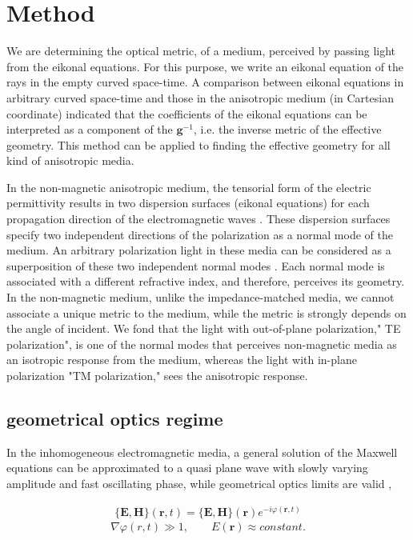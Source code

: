\documentclass[9pt,twocolumn,twoside]{osajnl}
\begin{document}
\section{ Method}

We are determining the optical metric, of a medium, perceived by passing light from the eikonal equations.
For this purpose, we write an eikonal equation of the rays in the empty curved space-time. A comparison between eikonal equations in arbitrary curved space-time and those in the anisotropic medium (in Cartesian coordinate) indicated that the coefficients of the eikonal equations can be interpreted as a component of the $\mathbf{g}^{-1}$, i.e. the inverse metric of the effective geometry. 
This method can be applied to finding the effective geometry for all kind of anisotropic media.

In the non-magnetic anisotropic medium, the tensorial form of the electric permittivity results in two dispersion surfaces (eikonal equations) for each propagation direction of the electromagnetic waves \cite{born1999principles}. 
These dispersion surfaces specify two independent directions of the polarization as a normal mode of the medium. An arbitrary polarization light in these media can be considered as a superposition of these two independent normal modes \cite{saleh1991fundamentals}.
 Each normal mode is associated with a different refractive index, and therefore, perceives its geometry.  In the non-magnetic medium, unlike the impedance-matched media, we cannot associate a unique metric to the medium, while the metric is strongly depends on the angle of incident.
We fond that the light with out-of-plane polarization," TE polarization",  is one of the normal modes that perceives non-magnetic media as an isotropic response from the medium, whereas the light with in-plane polarization "TM polarization," sees the anisotropic response. 



\subsection{geometrical optics regime}

In the inhomogeneous electromagnetic media, a general solution of the Maxwell equations can be approximated to a quasi plane wave with slowly varying amplitude and fast oscillating phase, while geometrical optics limits are valid \cite{kravtsov1990geometrical, sluijter2010ray, leonhardt2012geometry}, 

\begin{gather} \label{general-sl}
\{\mathbf{E,H}\}(\mathbf{r},t)=\{\mathbf{E,H}\}(\mathbf{r})e^{-i\varphi(\mathbf{r},t)}
\end{gather}
\begin{equation}\label{geometric-optic}
\nabla{\varphi(r,t)}\gg 1,\qquad E(\mathbf{r})\approx constant.
\end{equation}
\end{document}
